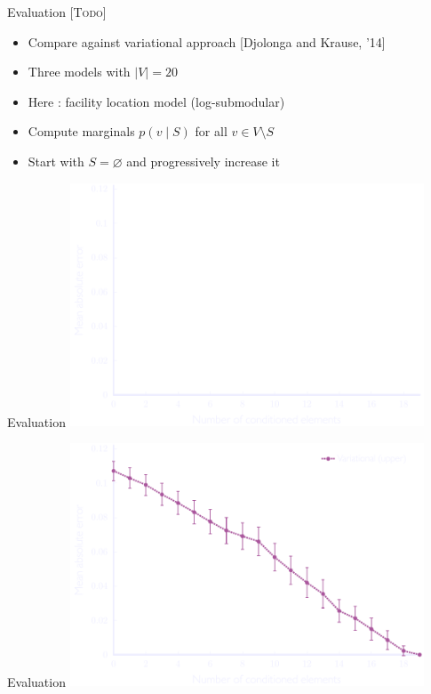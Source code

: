 \documentclass[mathserif]{beamer}
\newcommand{\todo}[1]{{\scriptsize\color{yellow}\textsc{[Todo]}}}
\newcommand{\qcite}[1]{{\scriptsize\color{col2}[#1]}}
\begin{document}
\begin{frame}{Evaluation \todo{}}
\vspace{0.5em}
\begin{itemize}
\item Compare against variational approach \qcite{Djolonga and Krause, '14}
\vspace{1.5em}
\item Three models with $|V| = 20$
\vspace{1.5em}
\item Here : facility location model (log-submodular)
\vspace{1.5em}
\item Compute marginals $p(v \mid S)$ for all $v \in V \setminus S$
\vspace{1.5em}
\item Start with $S = \varnothing$ and progressively increase it
\end{itemize}
\end{frame}

\begin{frame}{Evaluation}
\vspace{1em}
\centering
\includegraphics[width=4.15in,trim=6 0 0 0,clip]{figures/floc_0.pdf}
\end{frame}

\begin{frame}{Evaluation}
\vspace{1em}
\centering
\includegraphics[width=4.15in,trim=6 0 0 0,clip]{figures/floc_1.pdf}
\end{frame}
\end{document}
